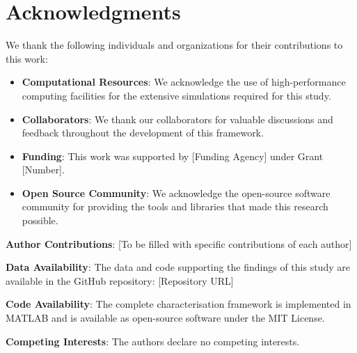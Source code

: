 \section*{Acknowledgments}

We thank the following individuals and organizations for their contributions to this work:

\begin{itemize}
    \item \textbf{Computational Resources}: We acknowledge the use of high-performance computing facilities for the extensive simulations required for this study.
    \item \textbf{Collaborators}: We thank our collaborators for valuable discussions and feedback throughout the development of this framework.
    \item \textbf{Funding}: This work was supported by [Funding Agency] under Grant [Number].
    \item \textbf{Open Source Community}: We acknowledge the open-source software community for providing the tools and libraries that made this research possible.
\end{itemize}

\noindent\textbf{Author Contributions}: [To be filled with specific contributions of each author]

\noindent\textbf{Data Availability}: The data and code supporting the findings of this study are available in the GitHub repository: [Repository URL]

\noindent\textbf{Code Availability}: The complete characterisation framework is implemented in MATLAB and is available as open-source software under the MIT License.

\noindent\textbf{Competing Interests}: The authors declare no competing interests.
